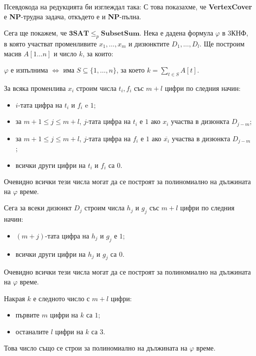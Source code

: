 \documentclass{article}
\newcommand{\NP}{\textbf{NP}}
\theoremstyle{definition}
\theoremstyle{plain}
\theoremstyle{remark}
\theoremstyle{definition}
\begin{document}
Псевдокода на редукцията би изглеждал така:
С това показахме, че \textbf{VertexCover} е \NP-трудна задача, откъдето е и \NP-пълна.

\pagebreak

Сега ще покажем, че $\mathbf{3SAT} \leq_p \mathbf{SubsetSum}$.
Нека е дадена формула $\varphi$ в 3КНФ, в която участват променливите $x_1, \dots, x_m$ и дизюнктите $D_1, \dots, D_l$.
Ще построим масив $A[1 \dots n]$ и число $k$, за които:
\begin{center}
    $\varphi$ е изпълнима $\iff$ има $S \subseteq \{ 1, \dots, n \}$, за което $k = \sum\limits_{t \in S} A[t]$.
\end{center}
За всяка променлива $x_i$ строим числа $t_i, f_i$ със $m + l$ цифри по следния начин:
\begin{itemize}
    \item $i$-тата цифра на $t_i$ и $f_i$ e $1$;
    \item за $m + 1 \leq j \leq m + l$, $j$-тата цифра на $t_i$ е $1$ ако $x_i$ участва в дизюнкта $D_{j - m}$;
    \item за $m + 1 \leq j \leq m + l$, $j$-тата цифра на $f_i$ е $1$ ако $\overline{x_i}$ участва в дизюнкта $D_{j - m}$;
    \item всички други цифри на $t_i$ и $f_i$ са $0$.
\end{itemize}
Очевидно всички тези числа могат да се построят за полиномиално на дължината на $\varphi$ време.

Сега за всеки дизюнкт $D_j$ строим числа $h_j$ и $g_j$ със $m + l$ цифри по следния начин:
\begin{itemize}
    \item $(m + j)$-тата цифра на $h_j$ и $g_j$ е $1$;
    \item всички други цифри на $h_j$ и $g_j$ са $0$.
\end{itemize}
Очевидно всички тези числа могат да се построят за полиномиално на дължината на $\varphi$ време.

Накрая $k$ е следното число с $m + l$ цифри:
\begin{itemize}
    \item първите $m$ цифри на $k$ са $1$;
    \item останалите $l$ цифри на $k$ са $3$.
\end{itemize}
Това число също се строи за полиномиално на дължината на $\varphi$ време.
\end{document}
